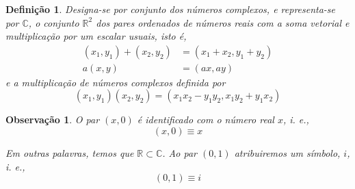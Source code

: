 \documentclass[12pt, oneside, a4paper, english, brazil]{abntex2}
\providecommand{\Rdois}{\mathbb{R}^2}
\newcommand{\C}{\mathbb{C}}
\newcounter{geral}
\theoremstyle{normal}
\newtheorem{definition}[geral]{Definição}
\theoremstyle{observacao}
\newtheorem*{obs}{Observação}
\begin{document}
\begin{definition}\label{defcomplexos}
Designa-se por conjunto dos números complexos, e representa-se por $\C$, o conjunto $\Rdois$ dos pares ordenados de números reais com a soma vetorial e multiplicação por um escalar usuais, isto é,
\begin{align*}
(x_1,y_1)+(x_2,y_2)&=(x_1+x_2,y_1+y_2)\\
a(x,y)&=(ax,ay)
\end{align*}
e a multiplicação de números complexos definida por
\[
(x_1,y_1)(x_2,y_2)=(x_1x_2 - y_1y_2, x_1y_2 + y_1x_2)
\]
\end{definition}

\begin{obs}O par $(x, 0)$ é identificado com o número real $x$, i. e., 
\[
(x,0)\equiv x
\]

Em outras palavras, temos que $\mathbb{R} \subset \C$. Ao par $(0,1)$ atribuiremos um símbolo, $i$, i. e.,
\[
(0,1) \equiv i
\]
\end{obs}
\end{document}
